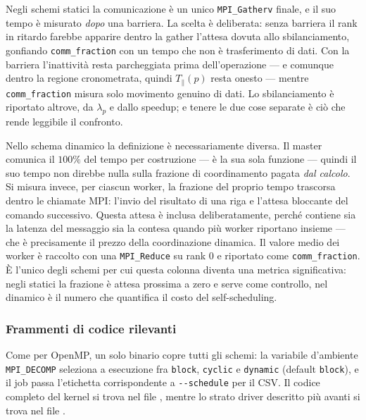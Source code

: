 Negli schemi statici la comunicazione è un unico \texttt{MPI\_Gatherv} finale, e
il suo tempo è misurato \emph{dopo} una barriera. La scelta è deliberata: senza
barriera il rank in ritardo farebbe apparire dentro la gather l'attesa dovuta
allo sbilanciamento, gonfiando \texttt{comm\_fraction} con un tempo che non è
trasferimento di dati. Con la barriera l'inattività resta parcheggiata prima
dell'operazione --- e comunque dentro la regione cronometrata, quindi $T_\parallel(p)$
resta onesto --- mentre \texttt{comm\_fraction} misura solo movimento genuino di
dati. Lo sbilanciamento è riportato altrove, da $\lambda_p$ e dallo speedup; e
tenere le due cose separate è ciò che rende leggibile il confronto.

Nello schema dinamico la definizione è necessariamente diversa. Il master
comunica il $100\%$ del tempo per costruzione --- è la sua sola funzione ---
quindi il suo tempo non direbbe nulla sulla frazione di coordinamento pagata
\emph{dal calcolo}. Si misura invece, per ciascun worker, la frazione del proprio
tempo trascorsa dentro le chiamate MPI: l'invio del risultato di una riga e
l'attesa bloccante del comando successivo. Questa attesa è inclusa
deliberatamente, perché contiene sia la latenza del messaggio sia la contesa
quando più worker riportano insieme --- che è precisamente il prezzo della
coordinazione dinamica. Il valore medio dei worker è raccolto con una
\texttt{MPI\_Reduce} su rank $0$ e riportato come \texttt{comm\_fraction}. È
l'unico degli schemi per cui questa colonna diventa una metrica significativa:
negli statici la frazione è attesa prossima a zero e serve come controllo, nel
dinamico è il numero che quantifica il costo del self-scheduling.

\subsubsection{Frammenti di codice rilevanti}
\label{sec:mpi-codice}

Come per OpenMP, un solo binario copre tutti gli schemi: la variabile d'ambiente
\texttt{MPI\_DECOMP} seleziona a esecuzione fra \texttt{block}, \texttt{cyclic}
e \texttt{dynamic} (default \texttt{block}), e il job passa l'etichetta
corrispondente a \texttt{-{}-schedule} per il CSV. Il codice completo del kernel
si trova nel file , mentre lo strato
driver descritto più avanti si trova nel file .

